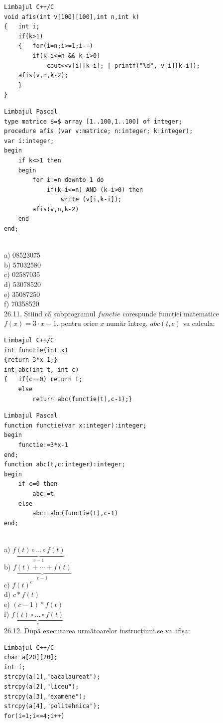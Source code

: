 {{\begin{verbatim}
Limbajul C++/C
void afis(int v[100][100],int n,int k)
{   int i;
    if(k>1)
    {   for(i=n;i>=1;i--)
        if(k-i<=n && k-i>0)
            cout<<v[i][k-i]; | printf("%d", v[i][k-i]);
    afis(v,n,k-2);
    }
}
\end{verbatim}
\begin{verbatim}
Limbajul Pascal
type matrice $=$ array [1..100,1..100] of integer;
procedure afis (var v:matrice; n:integer; k:integer);
var i:integer;
begin
    if k<>1 then
    begin
        for i:=n downto 1 do
            if(k-i<=n) AND (k-i>0) then
                write (v[i,k-i]);
        afis(v,n,k-2)
    end
end;
\end{verbatim}
\\
a) 08523075
\\
b) 57032580
\\
c) 02587035
\\
d) 53078520
\\
e) 35087250
\\
f) 70358520
\\
26.11. Știind că subprogramul $functie$ corespunde funcției matematice $f(x)=3 \cdot x-1$, pentru orice $x$ număr întreg, $abc(t, c)$ va calcula:
\begin{verbatim}
Limbajul C++/C
int functie(int x)
{return 3*x-1;}
int abc(int t, int c)
{   if(c==0) return t;
    else
        return abc(functie(t),c-1);}
\end{verbatim}
\begin{verbatim}
Limbajul Pascal
function functie(var x:integer):integer;
begin
    functie:=3*x-1
end;
function abc(t,c:integer):integer;
begin
    if c=0 then
        abc:=t
    else
        abc:=abc(functie(t),c-1)
end;
\end{verbatim}
\\
a) $\underbrace{f(t) \circ \ldots \circ f(t)}_{c-1}$
\\
b) $\underbrace{f(t)+\cdots+f(t)}_{c-1}$
\\
c) $f(t)^{c}$
\\
d) $c * f(t)$
\\
e) $(c-1) * f(t)$
\\
f) $\underbrace{f(t) \circ \ldots \circ f(t)}_{c}$
\\
26.12. După executarea următoarelor instrucțiuni se va afișa:
\begin{verbatim}
Limbajul C++/C
char a[20][20];
int i;
strcpy(a[1],"bacalaureat");
strcpy(a[2],"liceu");
strcpy(a[3],"examene");
strcpy(a[4],"politehnica");
for(i=1;i<=4;i++)

\end{verbatim}}}
